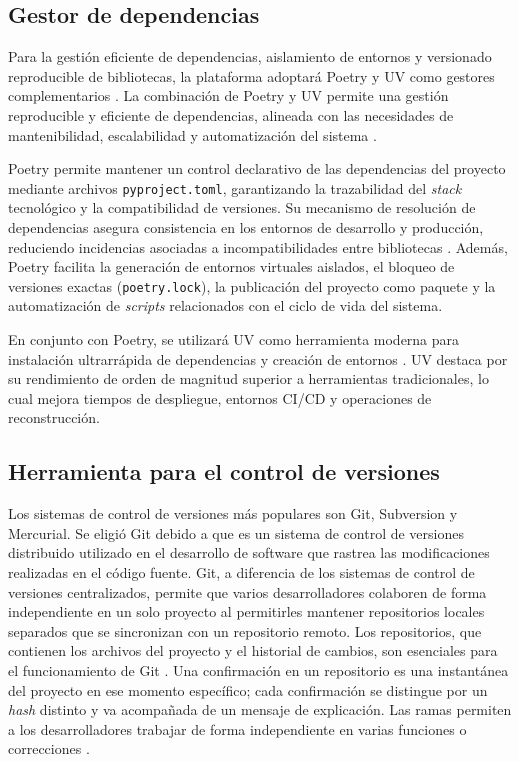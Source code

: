     
\subsection{Gestor de dependencias}

Para la gestión eficiente de dependencias, aislamiento de entornos y
versionado reproducible de bibliotecas, la plataforma adoptará Poetry y
UV como gestores complementarios \citep{poetry2024}.
La combinación de Poetry y UV permite una gestión reproducible y
eficiente de dependencias, alineada con las necesidades de mantenibilidad,
escalabilidad y automatización del sistema \citep{poetry2024, uv2024}.

Poetry permite mantener un control declarativo de las dependencias del
proyecto mediante archivos \texttt{pyproject.toml}, garantizando la trazabilidad
del \textit{stack} tecnológico y la compatibilidad de versiones. Su mecanismo de
resolución de dependencias asegura consistencia en los entornos de desarrollo y
producción, reduciendo incidencias asociadas a incompatibilidades entre
bibliotecas \citep{poetry2024}. Además, Poetry facilita la generación de entornos virtuales aislados, el
bloqueo de versiones exactas (\texttt{poetry.lock}), la publicación del
proyecto como paquete y la automatización de \textit{scripts} relacionados con el
ciclo de vida del sistema.

En conjunto con Poetry, se utilizará UV como herramienta moderna para
instalación ultrarrápida de dependencias y creación de entornos \citep{uv2024}. UV destaca
por su rendimiento de orden de magnitud superior a herramientas
tradicionales, lo cual mejora tiempos de despliegue, entornos \ac{CI/CD} y
operaciones de reconstrucción.

    
\subsection{Herramienta para el control de versiones}
        
Los sistemas de control de versiones más populares son Git, Subversion y Mercurial. 
Se eligió Git debido a que es un sistema de control de versiones distribuido 
utilizado en el desarrollo de software que rastrea las modificaciones realizadas 
en el código fuente. Git, a diferencia de los sistemas de control de versiones 
centralizados, permite que varios desarrolladores colaboren de forma independiente 
en un solo proyecto al permitirles mantener repositorios locales separados que se 
sincronizan con un repositorio remoto. Los repositorios, que contienen los archivos 
del proyecto y el historial de cambios, son esenciales para el funcionamiento de Git 
\citep{ponuthorai2022git}. Una confirmación en un repositorio es una instantánea del 
proyecto en ese momento específico; cada confirmación se distingue por un \textit{hash} 
distinto y va acompañada de un mensaje de explicación. Las ramas permiten a los 
desarrolladores trabajar de forma independiente en varias funciones o correcciones 
\citep{loeliger2012version}.
        
